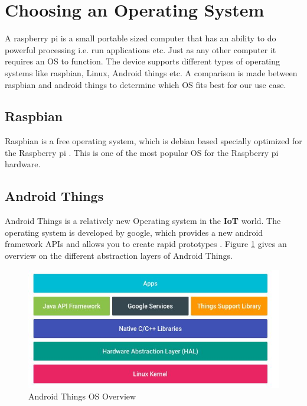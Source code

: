 \section{Choosing an Operating System}
        A raspberry pi is a small portable sized computer that has an ability to
        do powerful processing i.e. run applications etc. Just as any other computer
        it requires an OS to function. The device supports different
        types of operating systems like raspbian, Linux, Android things etc. A 
        comparison is made between raspbian and android things
        to determine which OS fits best for our use case.

        \subsection{Raspbian}
            Raspbian is a free operating system, which is debian based specially optimized 
            for the Raspberry pi \cite{raspbien}. This is one of the most popular OS for
            the Raspberry pi hardware. 

        \subsection{Android Things}
            Android Things is a relatively new Operating system in the \textbf{IoT} 
            \cite{IoT} world. The operating system is developed by google, 
            which provides a new android framework APIs and allows you 
            to create rapid prototypes \cite{androidThings}. Figure 
            \ref{fig:aThingsOverview} gives an overview on the different 
            abstraction layers of Android Things. 
            \begin{figure}[htbp!]
                \centering \includegraphics{grafiken/androidThingsOverview.jpg}
                \caption{Android Things OS Overview}
                \label{fig:aThingsOverview}
            \end{figure}
    

